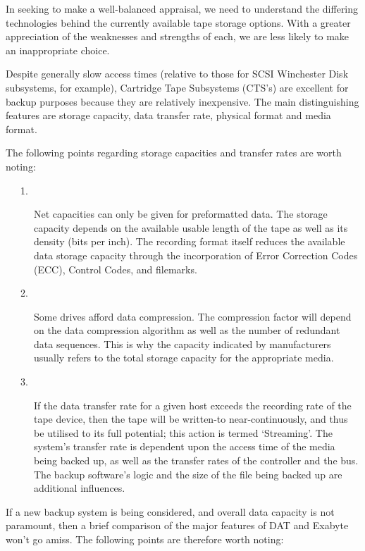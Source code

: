 In seeking to make a well-balanced appraisal, we need to understand the
differing technologies behind the currently available tape storage options.
With a greater appreciation of the weaknesses and strengths of each, we are
less likely to make an inappropriate choice.

Despite generally slow access times (relative to those for SCSI Winchester
Disk subsystems, for example), Cartridge Tape Subsystems (CTS's) are excellent
for backup purposes because they are relatively inexpensive. The main
distinguishing features are storage capacity, data transfer rate, physical
format and media format.

The following points regarding storage capacities and transfer rates are worth
noting:

\begin {description}

\item [\ \ \ 1.] Net capacities can only be given for preformatted data. The
storage capacity depends on the available usable length of the tape as well as
its density (bits per inch). The recording format itself reduces the available
data storage capacity through the incorporation of Error Correction Codes
(ECC), Control Codes, and filemarks.

\item [\ \ \ 2.] Some drives afford data compression. The compression factor
will depend on the data compression algorithm as well as the number of redundant
data sequences. This is why the capacity indicated by manufacturers usually
refers to the total storage capacity for the appropriate media.

\item [\ \ \ 3.] If the data transfer rate for a given host exceeds the
recording rate of the tape device, then the tape will be written-to
near-continuously, and thus be utilised to its full potential; this action is
termed `Streaming'. The system's transfer rate is dependent upon the access time
of the media being backed up, as well as the transfer rates of the controller
and the bus. The backup software's logic and the size of the file being backed
up are additional influences.

\end {description}

If a new backup system is being considered, and overall data capacity is not
paramount, then a brief comparison of the major features of DAT and Exabyte
won't go amiss. The following points are therefore worth noting:

